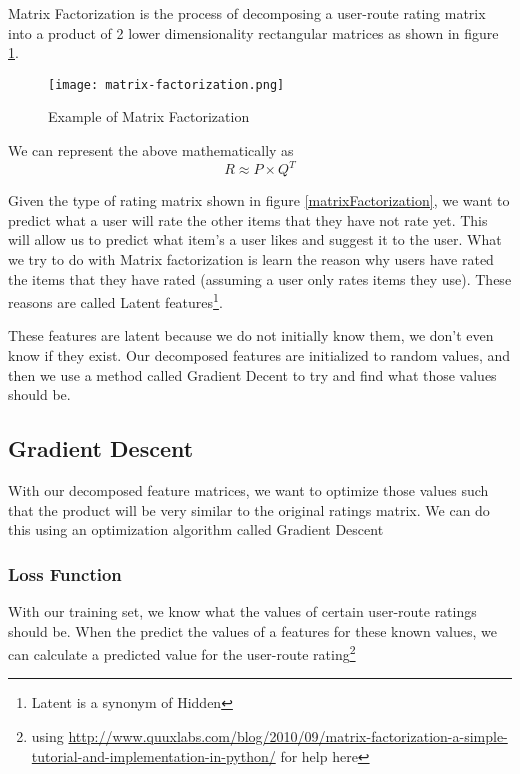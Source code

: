 Matrix Factorization is the process of decomposing a user-route rating matrix into a product of 2 lower dimensionality rectangular matrices \cite{koren2009bellkor} as shown in figure \ref{fig:matrixFactorization}.

\begin{figure}[ht]
    \centering
    \texttt{[image: matrix-factorization.png]}
    \caption{Example of Matrix Factorization}
    \label{fig:matrixFactorization}
\end{figure}

We can represent the above mathematically as
\begin{equation}
    R \approx P \times Q^T
\end{equation}

Given the type of rating matrix shown in figure \ref{matrixFactorization}, we want to predict what a user will rate the other items that they have not rate yet. This will allow us to predict what item's a user likes and suggest it to the user. What we try to do with Matrix factorization is learn the reason why users have rated the items that they have rated (assuming a user only rates items they use). These reasons are called Latent features\footnote{Latent is a synonym of Hidden}.

These features are latent because we do not initially know them, we don't even know if they exist. Our decomposed features are initialized to random values, and then we use a method called Gradient Decent to try and find what those values should be.

\subsection{Gradient Descent}
With our decomposed feature matrices, we want to optimize those values such that the product will be very similar to the original ratings matrix. We can do this using an optimization algorithm called Gradient Descent \cite{ruder2016overview}



\subsubsection{Loss Function}
With our training set, we know what the values of certain user-route ratings should be. When the predict the values of a features for these known values, we can calculate a predicted value for the user-route rating\footnote{using \url{http://www.quuxlabs.com/blog/2010/09/matrix-factorization-a-simple-tutorial-and-implementation-in-python/} for help here}


